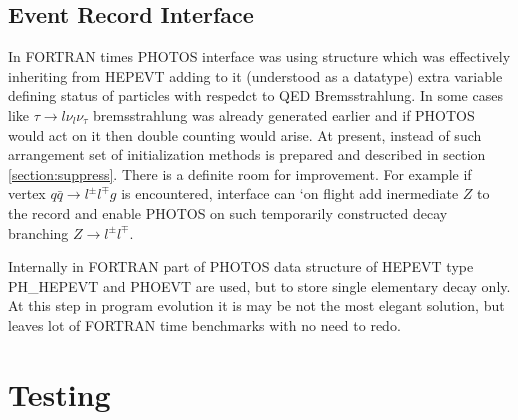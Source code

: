 \documentclass[]{Photos_interface_design}
\begin{document}
 
\subsection{Event Record Interface}
In FORTRAN times PHOTOS interface was using structure which was effectively
inheriting from  HEPEVT
adding to it (understood as a datatype) extra variable defining 
status of particles with respedct to QED Bremsstrahlung. In some cases like
$\tau \to l \nu_l \nu_\tau$ bremsstrahlung was already generated earlier
and if PHOTOS would act on it then double counting would arise.
At present, instead of such arrangement set of initialization methods is 
prepared and described in section \ref{section:suppress}. There is a definite room for 
improvement. For example if vertex $q \bar q \to l^\pm l^\mp g$ is encountered,
interface can `on flight add inermediate $Z$ to the record and enable PHOTOS
on such temporarily constructed decay branching $Z \to l^\pm l^\mp $.


 Internally in FORTRAN part of PHOTOS
data structure of HEPEVT type PH\_HEPEVT and PHOEVT are used, but  to store 
single elementary decay only. At this step in program evolution it is may be 
not the most elegant solution, but leaves lot of FORTRAN time benchmarks 
with no  need to redo.




\section{Testing}
\end{document}
